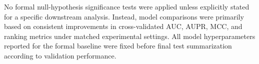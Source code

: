 No formal null-hypothesis significance tests were applied unless explicitly stated for a specific downstream analysis. Instead, model comparisons were primarily based on consistent improvements in cross-validated AUC, AUPR, MCC, and ranking metrics under matched experimental settings. All model hyperparameters reported for the formal baseline were fixed before final test summarization according to validation performance.
